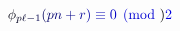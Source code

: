 \documentclass[12pt]{article}
\begin{document}
\makeatletter
\renewcommand*{\@textcolor}[3]{%
  \protect\leavevmode
  \begingroup
    \color#1{#2}#3%
  \endgroup
}
\makeatother
\begin{displaymath}
\mathcolor[RGB]{0,0,15}{\phi} _ { \mathcolor[RGB]{0,0,30}{p} \mathcolor[RGB]{0,0,45}{\ell} \mathcolor[RGB]{0,0,60}{-} \mathcolor[RGB]{0,0,75}{1} } \mathcolor[RGB]{0,0,90}{(} \mathcolor[RGB]{0,0,105}{p} \mathcolor[RGB]{0,0,120}{n} \mathcolor[RGB]{0,0,135}{+} \mathcolor[RGB]{0,0,150}{r} \mathcolor[RGB]{0,0,165}{)} \mathcolor[RGB]{0,0,180}{\equiv} \mathcolor[RGB]{0,0,195}{0} \mathcolor[RGB]{0,0,210}{\pmod} { \mathcolor[RGB]{0,0,225}{2} }
\end{displaymath}
\end{document}
